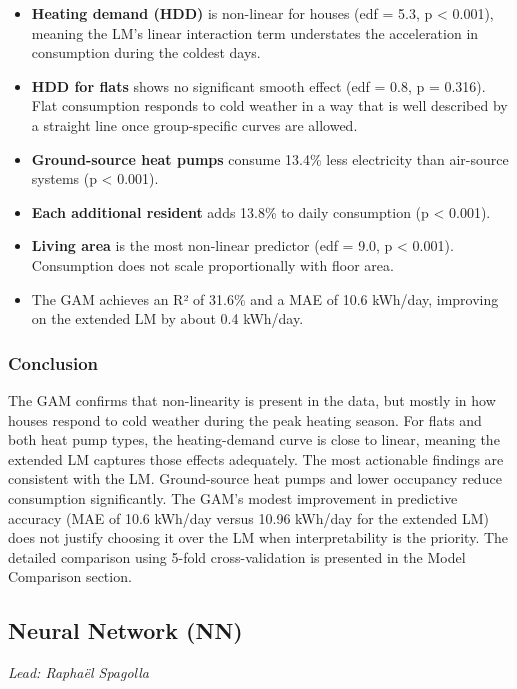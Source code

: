 \documentclass[
]{article}
\providecommand{\tightlist}{%
  \setlength{\itemsep}{0pt}\setlength{\parskip}{0pt}}
\begin{document}
\begin{itemize}
\tightlist
\item
  \textbf{Heating demand (HDD)} is non-linear for houses (edf = 5.3, p
  \textless{} 0.001), meaning the LM's linear interaction term
  understates the acceleration in consumption during the coldest days.
\item
  \textbf{HDD for flats} shows no significant smooth effect (edf = 0.8,
  p = 0.316). Flat consumption responds to cold weather in a way that is
  well described by a straight line once group-specific curves are
  allowed.
\item
  \textbf{Ground-source heat pumps} consume 13.4\% less electricity than
  air-source systems (p \textless{} 0.001).
\item
  \textbf{Each additional resident} adds 13.8\% to daily consumption (p
  \textless{} 0.001).
\item
  \textbf{Living area} is the most non-linear predictor (edf = 9.0, p
  \textless{} 0.001). Consumption does not scale proportionally with
  floor area.
\item
  The GAM achieves an R² of 31.6\% and a MAE of 10.6 kWh/day, improving
  on the extended LM by about 0.4 kWh/day.
\end{itemize}

\subsubsection{Conclusion}\label{conclusion-3}

The GAM confirms that non-linearity is present in the data, but mostly
in how houses respond to cold weather during the peak heating season.
For flats and both heat pump types, the heating-demand curve is close to
linear, meaning the extended LM captures those effects adequately. The
most actionable findings are consistent with the LM. Ground-source heat
pumps and lower occupancy reduce consumption significantly. The GAM's
modest improvement in predictive accuracy (MAE of 10.6 kWh/day versus
10.96 kWh/day for the extended LM) does not justify choosing it over the
LM when interpretability is the priority. The detailed comparison using
5-fold cross-validation is presented in the Model Comparison section.

\subsection{Neural Network (NN)}\label{nn}

\emph{Lead: Raphaël Spagolla}
\end{document}
